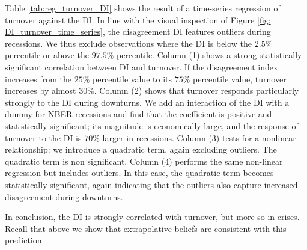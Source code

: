Table \ref{tab:reg_turnover_DI} shows the result of a time-series regression of turnover against the DI. In line with the visual inspection of Figure \ref{fig: DI_turnover_time_series}, the disagreement DI features outliers during recessions. We thus exclude observations where the DI is below the $2.5\%$ percentile or above the $97.5\%$ percentile. 
Column (1) shows a strong statistically significant correlation between DI and turnover.
If the disagreement index increases from the $25\%$ percentile value to its $75\%$ percentile value, turnover increases
by almost $30\%$. 
Column (2) shows that turnover responds particularly strongly to the DI during downturns. 
We add an interaction of the DI with a dummy for NBER recessions and find that the coefficient is positive and statistically significant; its magnitude is economically large, and the response of turnover to the DI is $70\%$ larger in recessions. 
Column (3) tests for a nonlinear relationship: we introduce a quadratic term, again excluding outliers. The quadratic term is non significant. %
Column (4) performs the same non-linear regression but includes outliers. In this case, the quadratic term becomes statistically significant, again indicating that the outliers also capture increased disagreement during downturns. 

In conclusion, the DI is strongly correlated with turnover, but more so in crises. Recall that above we show that extrapolative beliefs are consistent with this prediction.



